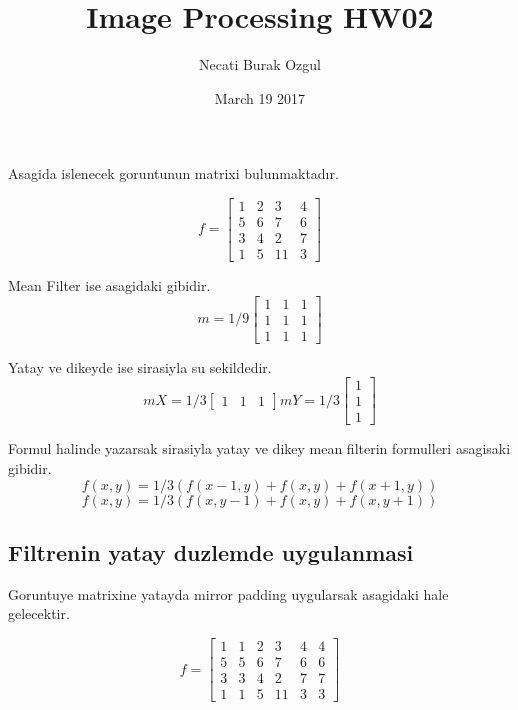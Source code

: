 \documentclass[12pt]{article}
\title{Image Processing HW02}
\author{Necati Burak Ozgul}
\date{March 19 2017}
\begin{document}
\maketitle

\section{}

Asagida islenecek goruntunun matrixi bulunmaktadır.

$$f = \begin{bmatrix}
1 & 2 & 3 & 4\\ 
5 & 6 & 7 & 6\\ 
3 & 4 & 2 & 7\\ 
1 & 5 & 11 & 3
\end{bmatrix}$$

Mean Filter ise asagidaki gibidir.
$$m = 1/9\begin{bmatrix}
 1&  1& 1\\ 
 1&  1& 1\\ 
 1&  1& 1
\end{bmatrix} $$

Yatay ve dikeyde ise sirasiyla su sekildedir.
$$mX = 1/3\begin{bmatrix}
 1&  1& 1
\end{bmatrix} mY = 1/3\begin{bmatrix}
 1 \\ 
 1 \\ 
 1 
\end{bmatrix} $$

Formul halinde yazarsak sirasiyla yatay ve dikey mean filterin formulleri asagisaki gibidir.
\begin{equation}
f(x,y) = 1/3 (f(x-1,y)+f(x,y)+f(x+1,y))
\end{equation}
\begin{equation}
f(x,y) = 1/3 (f(x,y-1)+f(x,y)+f(x,y+1))
\end{equation}


\subsection{Filtrenin yatay duzlemde uygulanmasi}

Goruntuye matrixine yatayda mirror padding uygularsak asagidaki hale gelecektir.

$$f = \begin{bmatrix}
 1&  1&  2&  3&  4& 4\\ 
 5&  5&  6&  7&  6& 6\\ 
 3&  3&  4&  2&  7& 7\\ 
 1&  1&  5&  11&  3& 3
\end{bmatrix}$$
\end{document}
